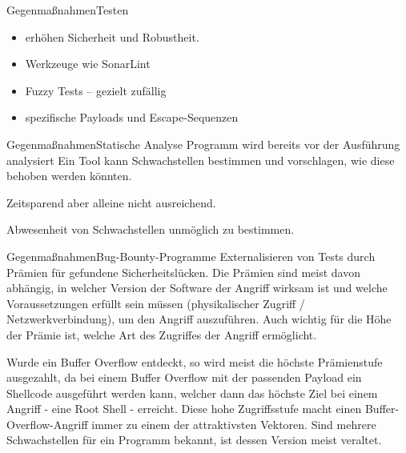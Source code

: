 \begin{frame}{Gegenmaßnahmen}{Testen}
    \begin{itemize}
        \item erhöhen Sicherheit und Robustheit. 
        \item Werkzeuge wie SonarLint%
        \item Fuzzy Tests -- gezielt zufällig
        \item spezifische Payloads und Escape-Sequenzen
    \end{itemize}    
\end{frame}


\begin{frame}{Gegenmaßnahmen}{Statische Analyse}
    Programm wird bereits vor der Ausführung analysiert 
    Ein Tool kann Schwachstellen bestimmen und
    vorschlagen, wie diese behoben werden könnten.
    
    Zeitsparend aber alleine nicht ausreichend.
    
    Abwesenheit von Schwachstellen unmöglich zu bestimmen.
\end{frame}


\begin{frame}{Gegenmaßnahmen}{Bug-Bounty-Programme} 
    Externalisieren von Tests durch Prämien für gefundene Sicherheitslücken.
    Die Prämien sind meist davon abhängig, in welcher Version der Software der Angriff 
    wirksam ist und welche Voraussetzungen erfüllt sein müssen (physikalischer Zugriff / Netzwerkverbindung),
    um den Angriff auszuführen. Auch wichtig für die Höhe der Prämie ist, welche Art des Zugriffes
    der Angriff ermöglicht.
    
    Wurde ein Buffer Overflow entdeckt, so wird meist die höchste Prämienstufe ausgezahlt, da bei einem
    Buffer Overflow mit der passenden Payload ein Shellcode ausgeführt werden kann, welcher dann das
    höchste Ziel bei einem Angriff - eine Root Shell - erreicht.
    Diese hohe Zugriffsstufe macht einen Buffer-Overflow-Angriff immer zu einem der attraktivsten Vektoren. 
    Sind mehrere Schwachstellen für ein Programm bekannt, ist dessen Version meist veraltet. 
    
    
\end{frame}



